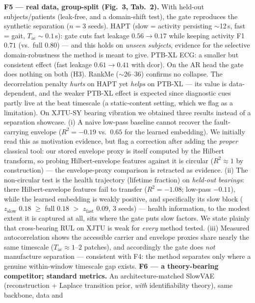 \documentclass[10pt,twocolumn]{article}
\begin{document}
\textbf{F5 --- real data, group-split (Fig.~3, Tab.~2).} With held-out
subjects/patients (leak-free, and a domain-shift test), the gate reproduces
the synthetic separation ($n{=}3$ seeds). HAPT \cite{reyes2016transition}
(slow = activity persisting
$\sim$12\,s, fast = gait, $T_{\mathrm{ac}}\!\sim\!0.1$\,s): gate cuts fast
leakage $0.56\!\to\!0.17$ while keeping activity F1 $0.71$ (vs.\ full $0.80$)
--- and this holds on \emph{unseen subjects}, evidence for the selective
domain-robustness the method is meant to give. PTB-XL \cite{wagner2020ptb}
ECG: a smaller but consistent effect (fast leakage $0.61\!\to\!0.41$ with dcor). On the AR head
the gate does nothing on both (H3). RankMe ($\sim$26--36) confirms no collapse.
The decorrelation penalty \emph{hurts} on HAPT yet \emph{helps} on PTB-XL ---
its value is data-dependent, and the weaker PTB-XL effect is expected since
diagnostic cues partly live at the beat timescale (a static-content setting,
which we flag as a limitation). On XJTU-SY \cite{wang2020xjtu} bearing
vibration we obtained three results instead of a separation showcase.
(i) A naive low-pass baseline cannot recover the fault-carrying envelope
($R^2{=}{-}0.19$ vs.\ $0.65$ for the learned embedding). We initially read
this as motivation evidence, but flag a correction after adding the
\emph{proper} classical tool: our stored envelope proxy is itself computed by
the Hilbert transform, so probing Hilbert-envelope features against it is
circular ($R^2\!\approx\!1$ by construction) --- the envelope-proxy comparison
is retracted as evidence.
(ii) The non-circular test is the health trajectory (lifetime fraction) on
\emph{held-out bearings}: there Hilbert-envelope features fail to transfer
($R^2{=}{-}1.08$; low-pass $-0.11$), while the learned embedding is weakly
positive, and specifically its slow block ($z_{\mathrm{slow}}$ $0.18$ $\ge$
full $0.18$ $>$ $z_{\mathrm{fast}}$ $0.09$, 3 seeds) --- health information,
to the modest extent it is captured at all, sits where the gate puts slow
factors. We state plainly that cross-bearing RUL on XJTU is weak for
\emph{every} method tested.
(iii) Measured autocorrelation shows the accessible carrier and envelope
proxies share nearly the same timescale ($T_{\mathrm{ac}}\!\approx\!1$--$2$
patches), and accordingly the gate does \emph{not} manufacture separation ---
consistent with F4: the method separates only where a genuine within-window
timescale gap exists.
\textbf{F6 --- a theory-bearing competitor; standard metrics.} An
architecture-matched SlowVAE \cite{klindt2021towards} (reconstruction + Laplace
transition prior, \emph{with} identifiability theory), same backbone, data and
\end{document}
